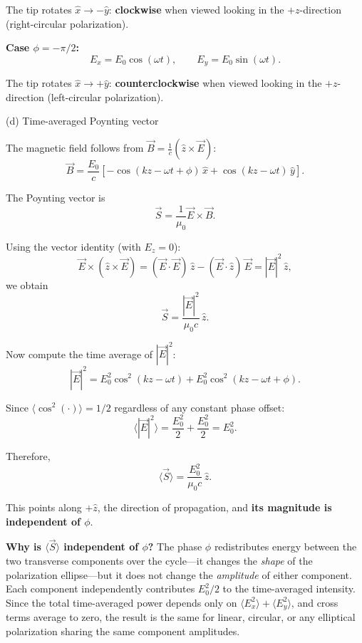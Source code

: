 \documentclass[12pt]{article}
\begin{document}
\begin{enumerate}
The tip rotates $\hat{x}\to -\hat{y}$: \textbf{clockwise} when viewed looking in the $+z$-direction (right-circular polarization).

\textbf{Case $\phi = -\pi/2$:}
\[
E_x = E_0\cos(\omega t), \qquad E_y = E_0\sin(\omega t).
\]

The tip rotates $\hat{x}\to +\hat{y}$: \textbf{counterclockwise} when viewed looking in the $+z$-direction (left-circular polarization).

(d) Time-averaged Poynting vector

The magnetic field follows from $\vec{B}=\frac{1}{c}(\hat{z}\times\vec{E})$:
\[
\vec{B} = \frac{E_0}{c}\left[-\cos(kz-\omega t+\phi)\,\hat{x}
+ \cos(kz-\omega t)\,\hat{y}\right].
\]

The Poynting vector is
\[
\vec{S} = \frac{1}{\mu_0}\vec{E}\times\vec{B}.
\]

Using the vector identity (with $E_z=0$):
\[
\vec{E}\times(\hat{z}\times\vec{E})
= (\vec{E}\cdot\vec{E})\,\hat{z}
- (\vec{E}\cdot\hat{z})\,\vec{E}
= |\vec{E}|^2\,\hat{z},
\]
we obtain
\[
\vec{S} = \frac{|\vec{E}|^2}{\mu_0 c}\,\hat{z}.
\]

Now compute the time average of $|\vec{E}|^2$:
\[
|\vec{E}|^2 = E_0^2\cos^2(kz-\omega t) + E_0^2\cos^2(kz-\omega t+\phi).
\]

Since $\langle\cos^2(\cdot)\rangle = 1/2$ regardless of any constant phase offset:
\[
\langle|\vec{E}|^2\rangle = \frac{E_0^2}{2}+\frac{E_0^2}{2} = E_0^2.
\]

Therefore,
\[
\boxed{\langle\vec{S}\rangle = \frac{E_0^2}{\mu_0 c}\,\hat{z}.}
\]

This points along $+\hat{z}$, the direction of propagation, and \textbf{its magnitude is independent of $\phi$}.

\textbf{Why is $\langle\vec{S}\rangle$ independent of $\phi$?} The phase $\phi$ redistributes energy between the two transverse components over the cycle---it changes the \emph{shape} of the polarization ellipse---but it does not change the \emph{amplitude} of either component. Each component independently contributes $E_0^2/2$ to the time-averaged intensity. Since the total time-averaged power depends only on $\langle E_x^2\rangle + \langle E_y^2\rangle$, and cross terms average to zero, the result is the same for linear, circular, or any elliptical polarization sharing the same component amplitudes.



\end{enumerate}
\end{document}
